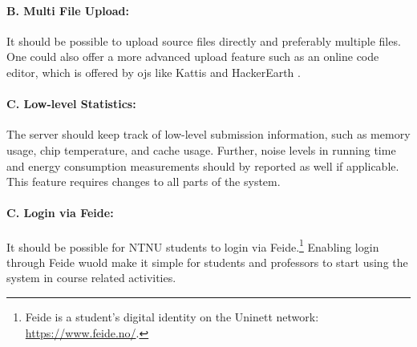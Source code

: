 \paragraph*{B. Multi File Upload:} It should be possible to upload source files directly and preferably multiple files. One could also offer a more advanced upload feature such as an online code editor, which is offered by \glspl{oj} like Kattis \cite{KATTIS} and HackerEarth \cite{HACKEREARTH}.

\paragraph*{C. Low-level Statistics:} The server should keep track of low-level submission information, such as memory usage, chip temperature, and cache usage. Further, noise levels in running time and energy consumption measurements should by reported as well if applicable. This feature requires changes to all parts of the system.

\paragraph*{C. Login via Feide:} It should be possible for NTNU students to login via Feide.\footnote{Feide is a student's digital identity on the Uninett network: \url{https://www.feide.no/}.} Enabling login through Feide wuold make it simple for students and professors to start using the system in course related activities.
